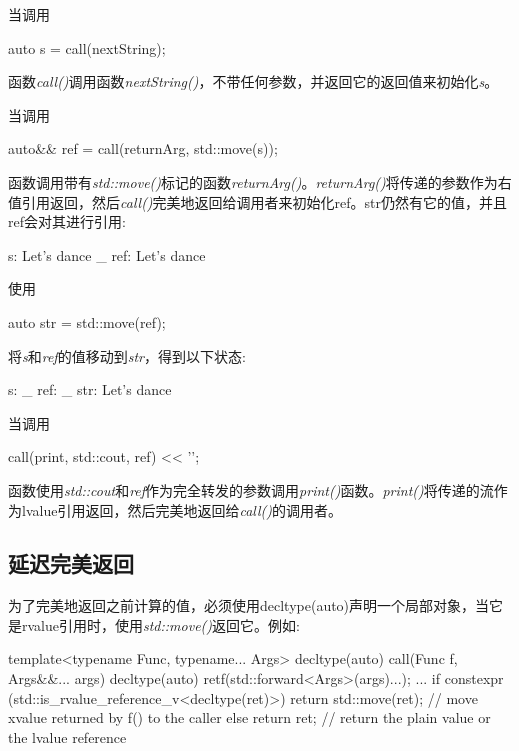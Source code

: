 当调用

\begin{cppcode}
auto s = call(nextString);
\end{cppcode}

函数\textit{call()}调用函数\textit{nextString()}，不带任何参数，并返回它的返回值来初始化\textit{s}。

当调用

\begin{cppcode}
auto&& ref = call(returnArg, std::move(s));
\end{cppcode}

函数调用带有\textit{std::move()}标记的函数\textit{returnArg()}。\textit{returnArg()}将传递的参数作为右值引用返回，然后\textit{call()}完美地返回给调用者来初始化ref。str仍然有它的值，并且ref会对其进行引用:

\begin{shell}
s: Let's dance _
ref: Let's dance
\end{shell}

使用

\begin{cppcode}
auto str = std::move(ref);
\end{cppcode}

将\textit{s}和\textit{ref}的值移动到\textit{str}，得到以下状态:

\begin{shell}
s: _
ref: _
str: Let's dance
\end{shell}

当调用

\begin{cppcode}
call(print, std::cout, ref) << '\n';
\end{cppcode}

函数使用\textit{std::cout}和\textit{ref}作为完全转发的参数调用\textit{print()}函数。\textit{print()}将传递的流作为lvalue引用返回，然后完美地返回给\textit{call()}的调用者。

\subsection{延迟完美返回}

为了完美地返回之前计算的值，必须使用decltype(auto)声明一个局部对象，当它是rvalue引用时，使用\textit{std::move()}返回它。例如:

\begin{cppcode}
template<typename Func, typename... Args>
decltype(auto) call(Func f, Args&&... args)
{
	decltype(auto) ret{f(std::forward<Args>(args)...)};
	...
	if constexpr (std::is_rvalue_reference_v<decltype(ret)>) {
		return std::move(ret); // move xvalue returned by f() to the caller
	}
	else {
		return ret; // return the plain value or the lvalue reference
	}
}
\end{cppcode}

